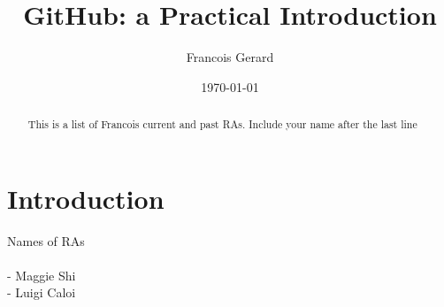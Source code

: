 \documentclass[12pt]{article}
\begin{document}
\title{GitHub: a Practical Introduction} %
\author{Francois Gerard}


\date{\today}  %

\maketitle 

\begin{abstract} 

	This is a list of Francois current and past RAs. Include your name after the last line
	
\end{abstract}

\section{Introduction}
Names of RAs \\ \\
- Maggie Shi \\
- Luigi Caloi  \\
	 
\end{document}
